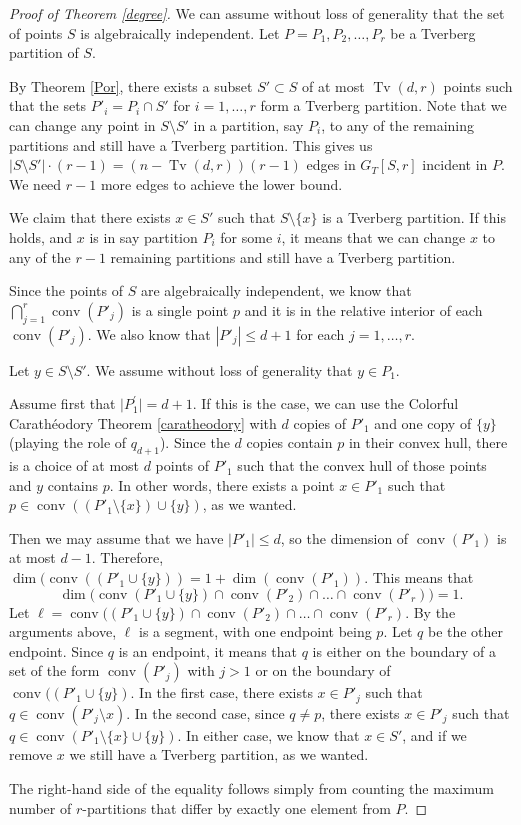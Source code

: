 \documentclass[11pt,a4paper]{article}
\theoremstyle{plain}
\theoremstyle{definition}
\newcommand{\conv}{\operatorname{conv}}
\newcommand{\tv}{\operatorname{Tv}}
\begin{document}
\begin{proof}[Proof of Theorem \ref{degree}]
We can assume without loss of generality that the set of points $S$ is algebraically independent.  Let $P=P_1, P_2, \dots, P_r$ be a Tverberg partition of $S$.

By Theorem \ref{Por}, there exists a subset $S' \subset S$ of at most $\tv(d,r)$ points such that the sets $P'_i = P_i \cap S'$ for $i=1,\dots, r$ form a Tverberg partition.   Note that we can change any point in $S \setminus S'$ in a partition, say $P_i$, to any of the remaining partitions and still have a Tverberg partition.  This gives us $|S\setminus S'|\cdot (r-1) = (n-\tv(d,r))(r-1)$ edges in $G_T[S,r]$ incident in $P$.  We need $r-1$ more edges to achieve the lower bound.

We claim that there exists $x \in S'$ such that $S \setminus \{x\}$ is a Tverberg partition.  If this holds, and $x$ is in say partition  $P_i$ for some $i$, it means that we can change $x$ to any of the $r-1$ remaining partitions and still have a Tverberg partition.  

Since the points of $S$ are algebraically independent, we know that $\bigcap_{j=1}^r \conv(P'_j)$ is a single point $p$ and it is in the relative interior of each $\conv(P'_j)$.  We also know that $|P'_j| \le d+1$ for each $j=1,\dots, r$.

Let $y \in S\setminus S'$.  We assume without loss of generality that $y \in P_1$. 

Assume first that  $\vert P^\prime_1 \vert = d+1$.  If this is the case, we can use the Colorful Carath\'eodory Theorem \ref{caratheodory} with $d$ copies of $P'_1$ and one copy of $\{y\}$ (playing the role of $q_{d+1}$).  Since the $d$ copies contain $p$ in their convex hull, there is a choice of at most $d$ points of $P'_1$ such that the convex hull of those points and $y$ contains $p$.  In other words, there exists a point $x \in P'_1$ such that $p \in \conv((P'_1 \setminus \{x\}) \cup \{y\})$, as we wanted.

Then we may assume that we have $|P'_1| \le d$, so the dimension of $\conv (P'_1)$ is at most $d-1$.  Therefore, $\dim (\conv((P'_1 \cup \{y\})) = 1 + \dim(\conv(P'_1))$.  This means that
\[
\dim \Big(\conv(P'_1 \cup \{y\}) \cap \conv(P'_2) \cap \dots \cap \conv(P'_r) \Big) = 1.
\]
Let $\ell = \conv((P'_1 \cup \{y\}) \cap \conv(P'_2) \cap \dots \cap \conv(P'_r)$.  By the arguments above, $\ell$ is a segment, with one endpoint being $p$.  Let $q$ be the other endpoint.  Since $q$ is an endpoint, it means that $q$ is either on the boundary of a set of the form $\conv(P'_j)$ with $j>1$ or on the boundary of $\conv((P'_1 \cup \{y\})$.  In the first case, there exists $x \in P'_j$ such that $q \in \conv(P'_j \setminus {x})$.  In the second case, since $q \neq p$, there exists $x \in P'_j$ such that $q \in \conv(P'_1\setminus\{x\} \cup \{y\})$.  In either case, we know that $x \in S'$, and if we remove $x$ we still have a Tverberg partition, as we wanted. 
\medskip

The right-hand side of the equality follows simply from counting the maximum number of $r$-partitions that differ by exactly one element from $P$. \end{proof}
\end{document}

